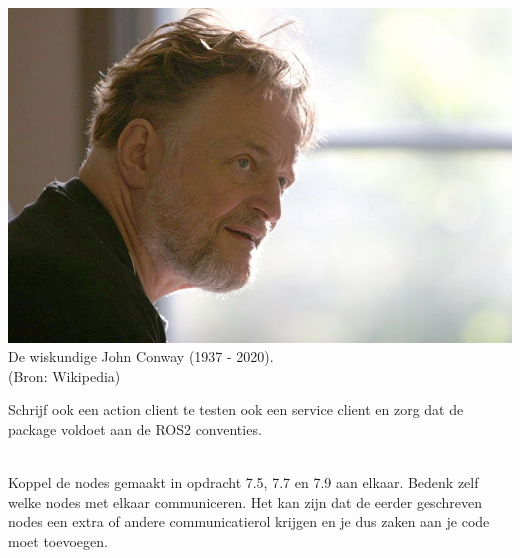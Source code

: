 \begin{exercise}
\begin{minipage}{0.6\textwidth}
\end{minipage}\hfill 
\begin{minipage}{0.3\textwidth}
\begin{center}
\includegraphics[width=\textwidth]{Pictures/640px-John_H_Conway_2005.jpg}\\
De wiskundige John Conway (1937 - 2020).\\{\tiny(Bron: Wikipedia)}\\
\end{center}
\end{minipage}


\vspace{1cm}
\noindent Schrijf ook een action client te testen ook een service client en zorg dat de package voldoet aan de ROS2 conventies. \\

\end{exercise}

\begin{exercise}[Pijpleiding]\mbox{}\\
Koppel de nodes gemaakt in opdracht 7.5, 7.7 en 7.9 aan elkaar. Bedenk zelf welke nodes met elkaar communiceren. Het kan zijn dat de eerder geschreven nodes een extra of andere communicatierol krijgen en je dus zaken aan je code moet toevoegen.
\end{exercise}